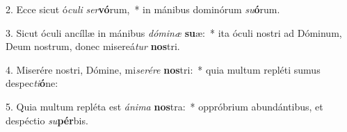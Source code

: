 2. Ecce sicut ó\textit{cu}\textit{li} \textit{ser}\textbf{vó}rum,~*  in mánibus dominórum \textit{su}\textbf{ó}rum.\

3. Sicut óculi ancíllæ in mánibus \textit{dó}\textit{mi}\textit{næ} \textbf{su}æ:~*  ita óculi nostri ad Dóminum, Deum nostrum, donec misereá\textit{tur} \textbf{nos}tri.\

4. Miserére nostri, Dómine, mi\textit{se}\textit{ré}\textit{re} \textbf{nos}tri:~*  quia multum repléti sumus despec\textit{ti}\textbf{ó}ne:\

5. Quia multum repléta est \textit{á}\textit{ni}\textit{ma} \textbf{nos}tra:~*  oppróbrium abundántibus, et despéctio \textit{su}\textbf{pér}bis.\

